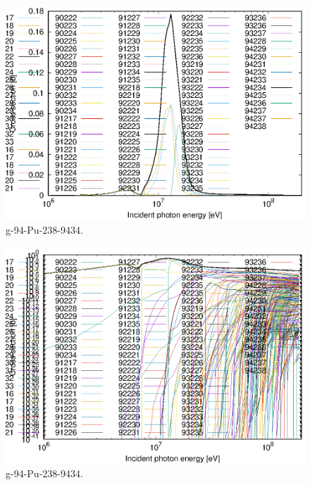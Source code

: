 \begin{figure}
 \includegraphics[width=\linewidth]{eps/g_94-Pu-238_9434.eps}
  \caption{g-94-Pu-238-9434.}
\end{figure}
\begin{figure}
 \includegraphics[width=\linewidth]{eps-log/g_94-Pu-238_9434.eps}
 \caption{g-94-Pu-238-9434.}
\end{figure}
\newpage \clearpage

